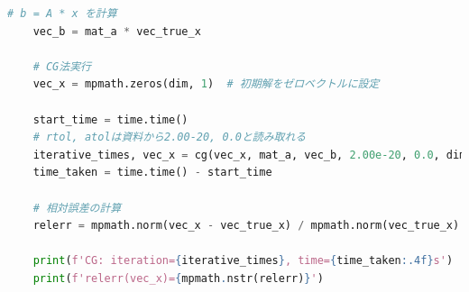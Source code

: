 \documentclass{article}
\begin{document}
\begin{lstlisting}[language=Python, caption=cg\_mpmath.py]
    # b = A * x を計算
    vec_b = mat_a * vec_true_x

    # CG法実行
    vec_x = mpmath.zeros(dim, 1)  # 初期解をゼロベクトルに設定
    
    start_time = time.time()
    # rtol, atolは資料から2.00-20, 0.0と読み取れる
    iterative_times, vec_x = cg(vec_x, mat_a, vec_b, 2.00e-20, 0.0, dim * 10)
    time_taken = time.time() - start_time
    
    # 相対誤差の計算
    relerr = mpmath.norm(vec_x - vec_true_x) / mpmath.norm(vec_true_x)
    
    print(f'CG: iteration={iterative_times}, time={time_taken:.4f}s')
    print(f'relerr(vec_x)={mpmath.nstr(relerr)}')
\end{lstlisting}
\end{document}
